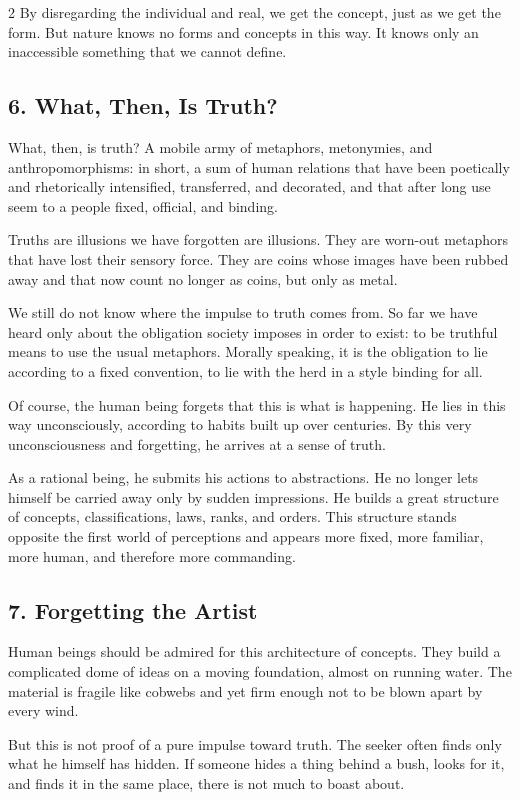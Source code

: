 \documentclass[12pt]{article}
\begin{document}
\begin{multicols}{2}
By disregarding the individual and real, we get the concept, just as we get the form. But nature knows no forms and concepts in this way. It knows only an inaccessible something that we cannot define.

\subsection*{6. What, Then, Is Truth?}
What, then, is truth? A mobile army of metaphors, metonymies, and anthropomorphisms: in short, a sum of human relations that have been poetically and rhetorically intensified, transferred, and decorated, and that after long use seem to a people fixed, official, and binding.

Truths are illusions we have forgotten are illusions. They are worn-out metaphors that have lost their sensory force. They are coins whose images have been rubbed away and that now count no longer as coins, but only as metal.

We still do not know where the impulse to truth comes from. So far we have heard only about the obligation society imposes in order to exist: to be truthful means to use the usual metaphors. Morally speaking, it is the obligation to lie according to a fixed convention, to lie with the herd in a style binding for all.

Of course, the human being forgets that this is what is happening. He lies in this way unconsciously, according to habits built up over centuries. By this very unconsciousness and forgetting, he arrives at a sense of truth.

As a rational being, he submits his actions to abstractions. He no longer lets himself be carried away only by sudden impressions. He builds a great structure of concepts, classifications, laws, ranks, and orders. This structure stands opposite the first world of perceptions and appears more fixed, more familiar, more human, and therefore more commanding.

\subsection*{7. Forgetting the Artist}
Human beings should be admired for this architecture of concepts. They build a complicated dome of ideas on a moving foundation, almost on running water. The material is fragile like cobwebs and yet firm enough not to be blown apart by every wind.

But this is not proof of a pure impulse toward truth. The seeker often finds only what he himself has hidden. If someone hides a thing behind a bush, looks for it, and finds it in the same place, there is not much to boast about.


\end{multicols}
\end{document}
